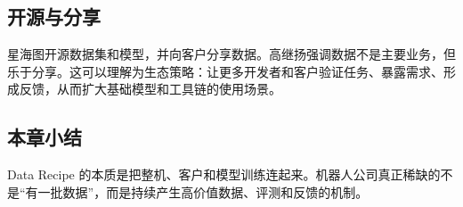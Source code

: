 \subsection{开源与分享}

星海图开源数据集和模型，并向客户分享数据。高继扬强调数据不是主要业务，但乐于分享。这可以理解为生态策略：让更多开发者和客户验证任务、暴露需求、形成反馈，从而扩大基础模型和工具链的使用场景。

\subsection{本章小结}

Data Recipe 的本质是把整机、客户和模型训练连起来。机器人公司真正稀缺的不是“有一批数据”，而是持续产生高价值数据、评测和反馈的机制。

